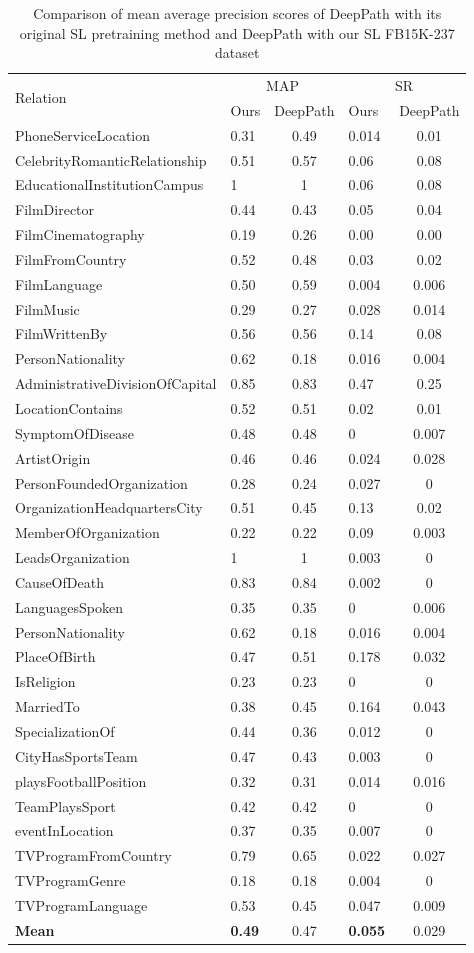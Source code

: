 \documentclass[lettersize,journal]{IEEEtran}
\begin{document}
\begin{table}
\centering
\caption{Comparison of mean average precision scores of DeepPath with its original SL pretraining method and DeepPath with our SL FB15K-237 dataset
}
\begin{tabular}{lp{}cp{}c}
\hline
\multirow{2}{4em}{Relation} & \multicolumn{2}{c}{MAP}  &\multicolumn{2}{c}{SR} \\
&Ours&DeepPath&Ours&DeepPath\\
\hline
PhoneServiceLocation& 0.31&0.49& 0.014& 0.01\\
CelebrityRomanticRelationship& 0.51&0.57 & 0.06&0.08\\
EducationalInstitutionCampus& 1&1&0.06&0.08\\
FilmDirector& 0.44 &0.43&0.05&0.04\\
FilmCinematography & 0.19&0.26&0.00&0.00\\
FilmFromCountry& 0.52&0.48 &0.03&0.02\\
FilmLanguage& 0.50&0.59 &0.004&0.006\\
FilmMusic& 0.29 &0.27&0.028&0.014\\
FilmWrittenBy & 0.56&0.56&0.14&0.08\\
PersonNationality&0.62&0.18&0.016&0.004\\
AdministrativeDivisionOfCapital&0.85 &0.83&0.47&0.25\\
LocationContains& 0.52 &0.51&0.02 &0.01\\
SymptomOfDisease& 0.48 &0.48&0 &0.007\\
ArtistOrigin&0.46&0.46&0.024&0.028\\
PersonFoundedOrganization&0.28&0.24&0.027&0\\
OrganizationHeadquartersCity&0.51&0.45&0.13&0.02\\
MemberOfOrganization&0.22&0.22&0.09&0.003\\
LeadsOrganization&1&1&0.003&0\\
CauseOfDeath&0.83&0.84&0.002&0\\
LanguagesSpoken&0.35&0.35&0&0.006\\
PersonNationality&0.62&0.18&0.016&0.004\\
PlaceOfBirth&0.47&0.51&0.178&0.032\\
IsReligion&0.23&0.23&0&0\\
MarriedTo&0.38&0.45&0.164&0.043\\
SpecializationOf&0.44&0.36&0.012&0\\
CityHasSportsTeam&0.47&0.43&0.003&0\\
playsFootballPosition&0.32&0.31&0.014&0.016\\
TeamPlaysSport&0.42&0.42&0&0\\
eventInLocation&0.37&0.35&0.007&0\\
TVProgramFromCountry&0.79&0.65&0.022&0.027\\
TVProgramGenre&0.18&0.18&0.004&0\\
TVProgramLanguage&0.53&0.45&0.047&0.009\\
\hline
\textbf{Mean}&\textbf{0.49}&0.47&\textbf{0.055}&0.029\\
\hline
\end{tabular}


\end{table}
\end{document}
